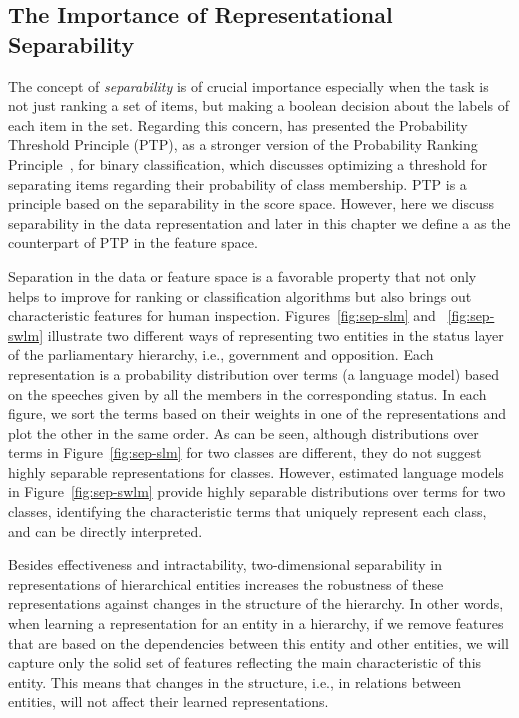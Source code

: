 \subsection{The Importance of Representational Separability}
The concept of \emph{separability} is of crucial importance especially when the task is not just ranking a set of items, but making a boolean decision about the labels of each item in the set.
Regarding this concern, \citet{Lewis:1995} has presented the Probability Threshold Principle (PTP), as a stronger version of the Probability Ranking Principle~\citep{Robertson:1977}, for binary classification, which discusses optimizing a threshold for separating items regarding their probability of class membership. 
PTP is a principle based on the separability in the score space. However, here we discuss separability in the data representation and later in this chapter we define a \emph{\ssp} as the counterpart of PTP in the feature space.

Separation in the data or feature space is a favorable property that not only helps to improve for ranking or classification algorithms but also brings out characteristic features for human inspection.
Figures~\ref{fig:sep-slm} and ~\ref{fig:sep-swlm} illustrate two different ways of representing two entities in the status layer of the parliamentary hierarchy, i.e., government and opposition. 
Each representation is a probability distribution over terms (a language model) based on the speeches given by all the members in the corresponding status. In each figure, we sort the terms based on their weights in one of the representations and plot the other in the same order. 
%
As can be seen, although distributions over terms in Figure~\ref{fig:sep-slm} for two classes are different, they do not suggest highly separable representations for classes. However, estimated language models in Figure~\ref{fig:sep-swlm} provide highly separable distributions over terms for two classes, identifying the characteristic terms that uniquely represent each class, and can be directly interpreted.  
 
Besides effectiveness and intractability, two-dimensional separability in representations of hierarchical entities increases the robustness of these representations against changes in the structure of the hierarchy. 
In other words, when learning a representation for an entity in a hierarchy, if we remove features that are based on the dependencies between this entity and other entities,  we will capture only the solid set of features reflecting the main characteristic of this entity. This means that changes in the structure, i.e., in relations between entities, will not affect their learned representations.

